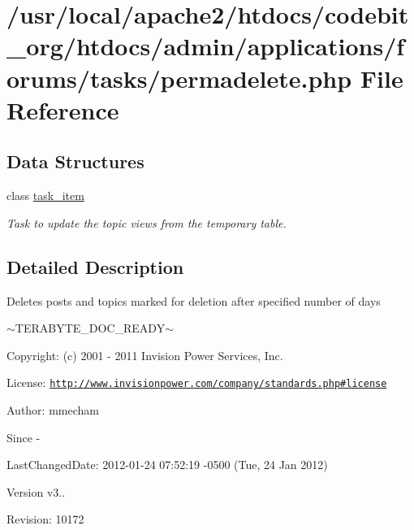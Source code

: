\hypertarget{permadelete_8php}{\section{/usr/local/apache2/htdocs/codebit\-\_\-org/htdocs/admin/applications/forums/tasks/permadelete.php File Reference}
\label{permadelete_8php}
}
\subsection*{Data Structures}
\begin{DoxyCompactItemize}
\item 
class \hyperlink{classtask__item}{task\-\_\-item}
\begin{DoxyCompactList}\small\item\em Task to update the topic views from the temporary table. \end{DoxyCompactList}\end{DoxyCompactItemize}


\subsection{Detailed Description}
\begin{DoxyVerb}  Deletes posts and topics marked for deletion after specified number of days
\end{DoxyVerb}
 $\sim$\-T\-E\-R\-A\-B\-Y\-T\-E\-\_\-\-D\-O\-C\-\_\-\-R\-E\-A\-D\-Y$\sim$ \begin{DoxyParagraph}{Copyright\-:}
(c) 2001 -\/ 2011 Invision Power Services, Inc.
\end{DoxyParagraph}
\begin{DoxyParagraph}{License\-:}
\href{http://www.invisionpower.com/company/standards.php#license}{\tt http\-://www.\-invisionpower.\-com/company/standards.\-php\#license}
\end{DoxyParagraph}
\begin{DoxyParagraph}{Author\-:}
mmecham 
\end{DoxyParagraph}
\begin{DoxySince}{Since}
-\/ 
\end{DoxySince}
\begin{DoxyParagraph}{Last\-Changed\-Date\-:}
2012-\/01-\/24 07\-:52\-:19 -\/0500 (Tue, 24 Jan 2012) 
\end{DoxyParagraph}
\begin{DoxyVersion}{Version}
v3.. 
\end{DoxyVersion}
\begin{DoxyParagraph}{Revision\-:}
10172 
\end{DoxyParagraph}
